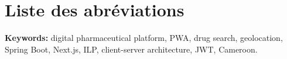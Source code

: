 \documentclass[12pt,a4paper]{report}
\begin{document}
	
	\color{GrisTexte} %
	
	
	\tableofcontents %
    \listoffigures 
	\newpage 
	
	\listoftables 
	\newpage 
	
	\chapter*{Liste des abréviations} 
    \noindent\textbf{Keywords:} digital pharmaceutical platform, PWA, drug search, geolocation, Spring Boot, Next.js, ILP, client-server architecture, JWT, Cameroon.
\end{document}
